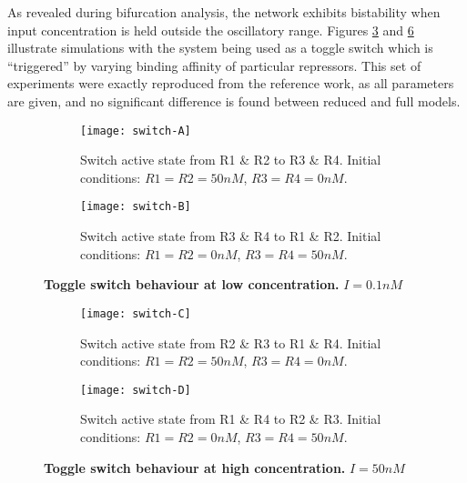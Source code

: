     As revealed during bifurcation analysis, the network exhibits bistability when input concentration is held outside the oscillatory range.
    Figures \ref{fig.switch-low} and \ref{fig.switch-high} illustrate simulations with the system being used as a toggle switch which is ``triggered'' by varying binding affinity of particular repressors.
    This set of experiments were exactly reproduced from the reference work, as all parameters are given, and no significant difference is found between reduced and full models.

    \begin{figure}[!htb]
      \centering
      \begin{subfigure}[t]{0.45\textwidth}
        \centering
        \texttt{[image: switch-A]}
        \caption{Switch active state from R1 \& R2 to R3 \& R4. Initial conditions: $R1 = R2 = 50nM$, $R3 = R4 = 0nM$.}
        \label{fig.switch-A}
      \end{subfigure}
      \hspace{1em}
      \begin{subfigure}[t]{0.45\textwidth}
        \centering
        \texttt{[image: switch-B]}
        \caption{Switch active state from R3 \& R4 to R1 \& R2. Initial conditions: $R1 = R2 = 0nM$, $R3 = R4 = 50nM$.}
        \label{fig.switch-B}
      \end{subfigure}
      \caption{\textbf{Toggle switch behaviour at low concentration.} $I = 0.1 nM$}
      \label{fig.switch-low}
    \end{figure}

    \begin{figure}[!htb]
      \centering
      \begin{subfigure}[t]{0.45\textwidth}
        \centering
        \texttt{[image: switch-C]}
        \caption{Switch active state from R2 \& R3 to R1 \& R4. Initial conditions: $R1 = R2 = 50nM$, $R3 = R4 = 0nM$.}
        \label{fig.switch-C}
      \end{subfigure}
      \hspace{1em}
      \begin{subfigure}[t]{0.45\textwidth}
        \centering
        \texttt{[image: switch-D]}
        \caption{Switch active state from R1 \& R4 to R2 \& R3. Initial conditions: $R1 = R2 = 0nM$, $R3 = R4 = 50nM$.}
        \label{fig.switch-D}
      \end{subfigure}
      \caption{\textbf{Toggle switch behaviour at high concentration.} $I = 50 nM$}
      \label{fig.switch-high}
    \end{figure}


